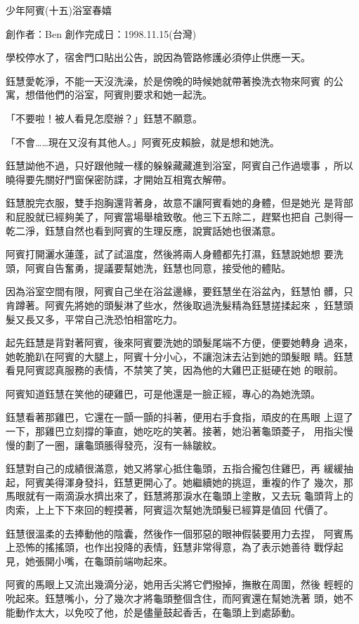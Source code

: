 



少年阿賓(十五)浴室春嬉

創作者：Ben
創作完成日：1998.11.15(台灣)


學校停水了，宿舍門口貼出公告，說因為管路修護必須停止供應一天。

鈺慧愛乾淨，不能一天沒洗澡，於是傍晚的時候她就帶著換洗衣物來阿賓
的公寓，想借他們的浴室，阿賓則要求和她一起洗。

「不要啦！被人看見怎麼辦？」鈺慧不願意。

「不會……現在又沒有其他人。」阿賓死皮賴臉，就是想和她洗。

鈺慧詏他不過，只好跟他賊一樣的躲躲藏藏進到浴室，阿賓自己作過壞事
，所以曉得要先關好門窗保密防諜，才開始互相寬衣解帶。

鈺慧脫完衣服，雙手抱胸還背著身，故意不讓阿賓看她的身體，但是她光
是背部和屁股就已經夠美了，阿賓當場舉槍致敬。他三下五除二，趕緊也把自
己剝得一乾二淨，鈺慧自然也看到阿賓的生理反應，說實話她也很滿意。

阿賓打開灑水蓮蓬，試了試溫度，然後將兩人身體都先打濕，鈺慧說她想
要洗頭，阿賓自告奮勇，提議要幫她洗，鈺慧也同意，接受他的體貼。

因為浴室空間有限，阿賓自己坐在浴盆邊緣，要鈺慧坐在浴盆內，鈺慧怕
髒，只肯蹲著。阿賓先將她的頭髮淋了些水，然後取過洗髮精為鈺慧搓揉起來
，鈺慧頭髮又長又多，平常自己洗恐怕相當吃力。

起先鈺慧是背對著阿賓，後來阿賓要洗她的頭髮尾端不方便，便要她轉身
過來，她乾脆趴在阿賓的大腿上，阿賓十分小心，不讓泡沫去沾到她的頭髮眼
睛。鈺慧看見阿賓認真服務的表情，不禁笑了笑，因為他的大雞巴正挺硬在她
的眼前。

阿賓知道鈺慧在笑他的硬雞巴，可是他還是一臉正經，專心的為她洗頭。

鈺慧看著那雞巴，它還在一顫一顫的抖著，便用右手食指，頑皮的在馬眼
上逗了一下，那雞巴立刻撐的筆直，她吃吃的笑著。接著，她沿著龜頭菱子，
用指尖慢慢的劃了一圈，讓龜頭脹得發亮，沒有一絲皺紋。

鈺慧對自己的成績很滿意，她又將掌心抵住龜頭，五指合攏包住雞巴，再
緩緩抽起，阿賓美得渾身發抖，鈺慧更開心了。她繼續她的挑逗，重複的作了
幾次，那馬眼就有一兩滴淚水擠出來了，鈺慧將那淚水在龜頭上塗散，又去玩
龜頭背上的肉索，上上下下來回的輕摸著，阿賓這次幫她洗頭髮已經算是值回
代價了。

鈺慧很溫柔的去捧動他的陰囊，然後作一個邪惡的眼神假裝要用力去捏，
阿賓馬上恐怖的搖搖頭，也作出投降的表情，鈺慧非常得意，為了表示她善待
戰俘起見，她張開小嘴，在龜頭前端吻起來。

阿賓的馬眼上又流出幾滴分泌，她用舌尖將它們撥掉，撫散在周圍，然後
輕輕的吮起來。鈺慧嘴小，分了幾次才將龜頭整個含住，而阿賓還在幫她洗著
頭，她不能動作太大，以免咬了他，於是儘量鼓起香舌，在龜頭上到處舔動。

